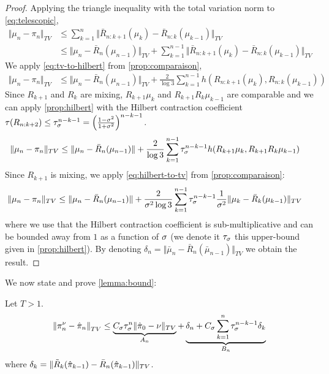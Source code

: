 \begin{proof}
Applying the triangle inequality with the total variation norm to \cref{eq:telescopic},
\begin{align}
    \Vert \mu_n - \pi_n \Vert_{TV} &\leq \sum_{k=1}^n \Vert \bar R_{n:k+1}(\mu_k) - \bar R_{n:k}(\mu_{k-1}) \Vert_{TV} & \\
    & \leq \Vert \mu_n - \bar R_n(\mu_{n-1})\Vert_{TV} +\sum_{k=1}^{n-1} \Vert \bar R_{n:k+1}(\mu_k) - \bar R_{n:k}(\mu_{k-1}) \Vert_{TV} &
\end{align}
We apply \cref{eq:tv-to-hilbert} from \cref{prop:comparaison},
\begin{align}
    \Vert \mu_n - \pi_n \Vert_{TV}& \leq \Vert \mu_n - \bar R_n(\mu_{n-1})\Vert_{TV} + \frac{2}{\log 3}\sum_{k=1}^{n-1}h(R_{n:k+1}(\mu_k), R_{n:k}(\mu_{k-1}))
\end{align}
Since $R_{k+1}$ and $R_k$ are mixing, $R_{k+1}\mu_k$ and $R_{k+1}R_{k}\mu_{k-1}$ are comparable and we can apply \cref{prop:hilbert} with the Hilbert contraction coefficient $\tau(R_{n:k+2})\leq \tau_\sigma^{n-k-1}= \left(\frac{1-\sigma^2}{1+\sigma^2}\right)^{n-k-1}$.
\begin{align}
\Vert \mu_n - \pi_n \Vert_{TV}& \leq \Vert \mu_n - \bar R_n(\mu_{n-1})\Vert + \frac{2}{\log 3}\sum_{k=1}^{n-1}\tau_\sigma^{n-k-1}h(R_{k+1}\mu_k, R_{k+1}R_k\mu_{k-1})
\end{align}
Since $R_{k+1}$ is mixing, we apply \cref{eq:hilbert-to-tv} from \cref{prop:comparaison}:
\begin{align}
\Vert \mu_n - \pi_n \Vert_{TV}& \leq \Vert \mu_n - \bar R_n(\mu_{n-1})\Vert + \frac{2}{\sigma^2\log 3}\sum_{k=1}^{n-1}\tau_\sigma^{n-k-1}\frac{1}{\sigma^2}\Vert \mu_k - \bar R_{k}(\mu_{k-1})\Vert_{TV}
\end{align}
where we use that the Hilbert contraction coefficient is sub-multiplicative and can be bounded away from $1$ as a function of $\sigma$ (we denote it $\tau_\sigma$ this upper-bound given in \cref{prop:hilbert}). By denoting $\delta_n = \Vert \bar\mu_n - \bar{R}_n(\bar\mu_{n-1})\Vert_{TV}$ we obtain the result.
\end{proof}

We now state and prove \cref{lemma:bound}:
\begin{lemma}\label{lemma:bound} Let $T > 1$.
    \begin{align}
        \left\Vert \pi_n^\nu - \hat\pi_n\right\Vert_{TV} \leq \underbrace{C_\sigma\tau_\sigma^n\Vert \hat\pi_0 - \nu\Vert_{TV}}_{A_n}+ \underbrace{\delta_n + C_\sigma\sum_{k=1}^n \tau_\sigma^{n-k-1}\delta_k}_{B_n}
    \end{align}
where $\delta_k = \Vert \tilde{{R}}_k(\hat \pi_{k-1}) - \bar R_n(\hat \pi_{k-1})\Vert_{TV}$.
\end{lemma}
